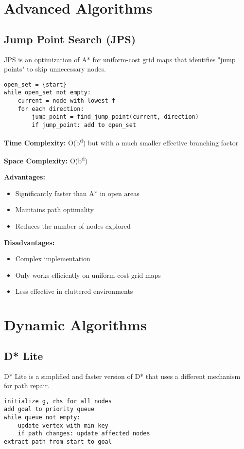 \documentclass[11pt,a4paper]{report}
\begin{document}
\section{Advanced Algorithms}

\subsection{Jump Point Search (JPS)}
JPS is an optimization of A* for uniform-cost grid maps that identifies "jump points" to skip unnecessary nodes.

\begin{verbatim}
open_set = {start}
while open_set not empty:
    current = node with lowest f
    for each direction:
        jump_point = find_jump_point(current, direction)
        if jump_point: add to open_set
\end{verbatim}

\textbf{Time Complexity:} O(b\textsuperscript{d}) but with a much smaller effective branching factor

\textbf{Space Complexity:} O(b\textsuperscript{d})

\textbf{Advantages:}
\begin{itemize}
    \item Significantly faster than A* in open areas
    \item Maintains path optimality
    \item Reduces the number of nodes explored
\end{itemize}

\textbf{Disadvantages:}
\begin{itemize}
    \item Complex implementation
    \item Only works efficiently on uniform-cost grid maps
    \item Less effective in cluttered environments
\end{itemize}

\section{Dynamic Algorithms}

\subsection{D* Lite}
D* Lite is a simplified and faster version of D* that uses a different mechanism for path repair.

\begin{verbatim}
initialize g, rhs for all nodes
add goal to priority queue
while queue not empty:
    update vertex with min key
    if path changes: update affected nodes
extract path from start to goal
\end{verbatim}
\end{document}
